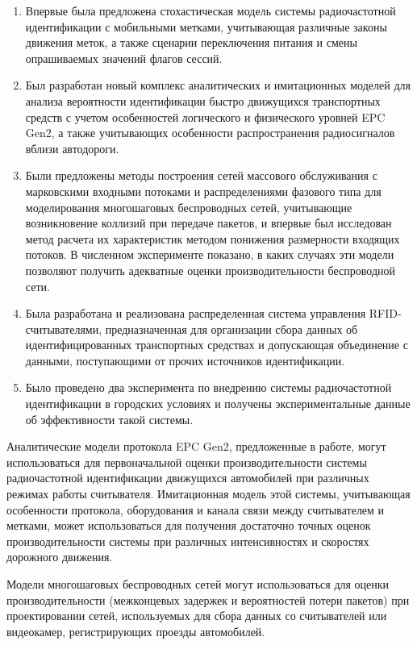 {\novelty}
\begin{enumerate}[beginpenalty=10000] %
  \item Впервые была предложена стохастическая модель системы радиочастотной идентификации с мобильными метками, учитывающая различные законы движения меток, а также сценарии переключения питания и смены опрашиваемых значений флагов сессий.
  \item Был разработан новый комплекс аналитических и имитационных моделей для анализа вероятности идентификации быстро движущихся транспортных средств с учетом особенностей логического и физического уровней EPC Gen2, а также учитывающих особенности распространения радиосигналов вблизи автодороги.
  \item Были предложены методы построения сетей массового обслуживания с марковскими входными потоками и распределениями фазового типа для моделирования многошаговых беспроводных сетей, учитывающие возникновение коллизий при передаче пакетов, и впервые был исследован метод расчета их характеристик методом понижения размерности входящих потоков. В численном эксперименте показано, в каких случаях эти модели позволяют получить адекватные оценки производительности беспроводной сети.
  \item Была разработана и реализована распределенная система управления RFID-считывателями, предназначенная для организации сбора данных об идентифицированных транспортных средствах и допускающая объединение с данными, поступающими от прочих источников идентификации.
  \item Было проведено два эксперимента по внедрению системы радиочастотной идентификации в городских условиях и получены экспериментальные данные об эффективности такой системы.
\end{enumerate}

{\influence} Аналитические модели протокола EPC Gen2, предложенные в работе, могут использоваться для первоначальной оценки производительности системы радиочастотной идентификации движущихся автомобилей при различных режимах работы считывателя. Имитационная модель этой системы, учитывающая особенности протокола, оборудования и канала связи между считывателем и метками, может использоваться для получения достаточно точных оценок производительности системы при различных интенсивностях и скоростях дорожного движения.

Модели многошаговых беспроводных сетей могут использоваться для оценки производительности (межконцевых задержек и вероятностей потери пакетов) при проектировании сетей, используемых для сбора данных со считывателей или видеокамер, регистрирующих проезды автомобилей.

